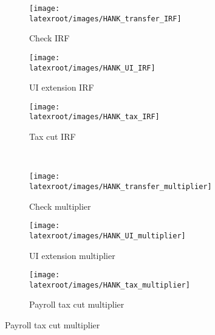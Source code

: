 \documentclass[qe]{econsocart}
\begin{document}
\begin{figure}[H]
  \centering
  \caption{General equilibrium policy comparison in HANK-SAM model}
  \label{fig:HANK_IRFs} 
    \centering
    \begin{subfigure}[b]{.30\linewidth}
      \centering
      \texttt{[image: \\latexroot/images/HANK\_transfer\_IRF]}
      \caption{Check IRF}
      \label{fig:hank_stimulus_irf} 
    \end{subfigure}
    \begin{subfigure}[b]{.30\linewidth}
      \centering
      \texttt{[image: \\latexroot/images/HANK\_UI\_IRF]}
      \caption{UI extension IRF}
      \label{fig:hank_UI_irf} 
    \end{subfigure}
    \begin{subfigure}[b]{.30\linewidth}
      \centering
      \texttt{[image: \\latexroot/images/HANK\_tax\_IRF]}
      \caption{Tax cut IRF}
      \label{fig:hank_tax_irf} 
    \end{subfigure}
    \\[1em]
    \begin{subfigure}[b]{.30\linewidth}
      \centering
      \texttt{[image: \\latexroot/images/HANK\_transfer\_multiplier]}
      \caption{Check multiplier}
      \label{fig:HANK_transfer_multiplier} 
    \end{subfigure}
    \begin{subfigure}[b]{.30\linewidth}
      \centering
      \texttt{[image: \\latexroot/images/HANK\_UI\_multiplier]}
      \caption{UI extension multiplier}
      \label{fig:HANK_UI_multiplier} 
    \end{subfigure}
    \begin{subfigure}[b]{.30\linewidth}
      \centering
      \texttt{[image: \\latexroot/images/HANK\_tax\_multiplier]}
      \caption{Payroll tax cut multiplier}
      \label{fig:HANK_tax_multiplier} 
    \end{subfigure}
\end{figure}
\end{document}
